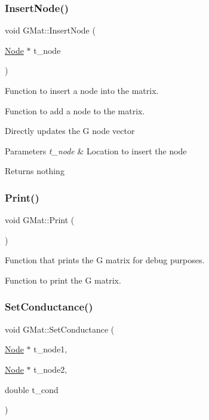 \subsubsection{\texorpdfstring{Insert\+Node()}{InsertNode()}}
{\footnotesize\ttfamily void G\+Mat\+::\+Insert\+Node (\begin{DoxyParamCaption}\item[{\hyperlink{classNode}{Node} $\ast$}]{t\+\_\+node }\end{DoxyParamCaption})}



Function to insert a node into the matrix. 

Function to add a node to the matrix.

Directly updates the G node vector 
\begin{DoxyParams}{Parameters}
{\em t\+\_\+node} & Location to insert the node \\
\hline
\end{DoxyParams}
\begin{DoxyReturn}{Returns}
nothing 
\end{DoxyReturn}
\mbox{\label{classGMat_a890e83e8d1d373e3858bd213b76c2da9}} 
\subsubsection{\texorpdfstring{Print()}{Print()}}
{\footnotesize\ttfamily void G\+Mat\+::\+Print (\begin{DoxyParamCaption}{ }\end{DoxyParamCaption})}



Function that prints the G matrix for debug purposes. 

Function to print the G matrix. \mbox{\label{classGMat_a1981ec0047b10ef19b2e4734921a5452}} 
\subsubsection{\texorpdfstring{Set\+Conductance()}{SetConductance()}}
{\footnotesize\ttfamily void G\+Mat\+::\+Set\+Conductance (\begin{DoxyParamCaption}\item[{\hyperlink{classNode}{Node} $\ast$}]{t\+\_\+node1,  }\item[{\hyperlink{classNode}{Node} $\ast$}]{t\+\_\+node2,  }\item[{double}]{t\+\_\+cond }\end{DoxyParamCaption})}



